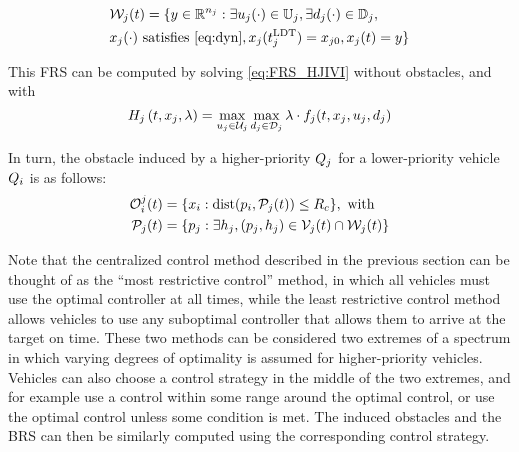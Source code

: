 \begin{equation}
\label{eq:FRS2}
\begin{aligned}
&\frs_j(t) = \{y \in \R^{n_j}: \exists u_j(\cdot)\in\cfset_j, \exists d_j(\cdot) \in \dfset_j, \\
&x_j(\cdot) \text{ satisfies \eqref{eq:dyn}}, x_j(\ldt_j) = x_{j0}, x_j(t) = y\}
\end{aligned}
\end{equation}

This FRS can be computed by solving \eqref{eq:FRS_HJIVI} without obstacles, and with
\vspace{-0.4em}
\begin{equation}
H_j\left(t, x_j, \lambda\right) = \max_{u_j \in \mathcal{U}_j} \max_{d_j \in \mathcal{D}_j} \lambda \cdot f_j(t, x_j, u_j, d_j)
\end{equation}

In turn, the obstacle induced by a higher-priority $Q_j$ for a lower-priority vehicle $Q_i$ is as follows:
\vspace{-0.4em}
\begin{equation}
\begin{aligned}
\mathcal{O}_i^j(t) &= \{x_i: \text{dist}(p_i, \mathcal{P}_j(t)) \le R_c \}, \text{ with} \\
\mathcal{P}_j(t) &= \{p_j: \exists h_j, (p_j, h_j) \in \mathcal{V}_j(t) \cap \mathcal{W}_j(t)\}
\end{aligned}
\end{equation}

Note that the centralized control method described in the previous section can be thought of as the ``most restrictive control'' method, in which all vehicles must use the optimal controller at all times, while the least restrictive control method allows vehicles to use any suboptimal controller that allows them to arrive at the target on time. These two methods can be considered two extremes of a spectrum in which varying degrees of optimality is assumed for higher-priority vehicles. Vehicles can also choose a control strategy in the middle of the two extremes, and for example use a control within some range around the optimal control, or use the optimal control unless some condition is met. The induced obstacles and the BRS can then be similarly computed using the corresponding control strategy.